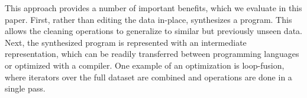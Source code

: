 This approach provides a number of important benefits, which we evaluate in this paper.
First, rather than editing the data in-place, \sys synthesizes a program.
This allows the cleaning operations to generalize to similar but previously unseen data.
Next, the synthesized program is represented with an intermediate representation, which can be readily transferred  between  programming languages  or  optimized  with  a compiler.
One example of an optimization is loop-fusion, where iterators over the full dataset are combined and operations are done in a single pass.









